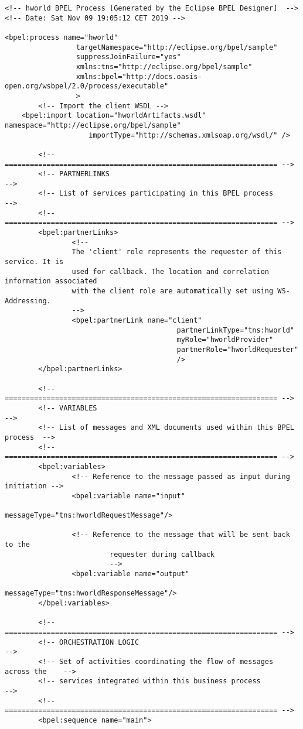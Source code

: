\begin{verbatim}
<!-- hworld BPEL Process [Generated by the Eclipse BPEL Designer]  -->
<!-- Date: Sat Nov 09 19:05:12 CET 2019 -->

<bpel:process name="hworld"
				 targetNamespace="http://eclipse.org/bpel/sample"
				 suppressJoinFailure="yes"
				 xmlns:tns="http://eclipse.org/bpel/sample"
				 xmlns:bpel="http://docs.oasis-open.org/wsbpel/2.0/process/executable"
				 >
		<!-- Import the client WSDL -->
	<bpel:import location="hworldArtifacts.wsdl" namespace="http://eclipse.org/bpel/sample" 
					importType="http://schemas.xmlsoap.org/wsdl/" />
					
		<!-- ================================================================= -->         
		<!-- PARTNERLINKS                                                      -->
		<!-- List of services participating in this BPEL process               -->
		<!-- ================================================================= -->         
		<bpel:partnerLinks>
				<!--
				The 'client' role represents the requester of this service. It is 
				used for callback. The location and correlation information associated
				with the client role are automatically set using WS-Addressing.
				-->
				<bpel:partnerLink name="client"
										 partnerLinkType="tns:hworld"
										 myRole="hworldProvider"
										 partnerRole="hworldRequester"
										 />
		</bpel:partnerLinks>
	
		<!-- ================================================================= -->         
		<!-- VARIABLES                                                         -->
		<!-- List of messages and XML documents used within this BPEL process  -->
		<!-- ================================================================= -->         
		<bpel:variables>
				<!-- Reference to the message passed as input during initiation -->
				<bpel:variable name="input"
									messageType="tns:hworldRequestMessage"/>
									
				<!-- Reference to the message that will be sent back to the 
						 requester during callback
						 -->
				<bpel:variable name="output"
									messageType="tns:hworldResponseMessage"/>
		</bpel:variables>

		<!-- ================================================================= -->         
		<!-- ORCHESTRATION LOGIC                                               -->
		<!-- Set of activities coordinating the flow of messages across the    -->
		<!-- services integrated within this business process                  -->
		<!-- ================================================================= -->         
		<bpel:sequence name="main">
				

\end{verbatim}
